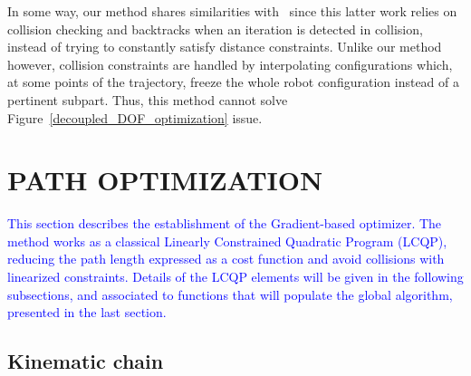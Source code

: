 \documentclass{tADR2e}
\begin{document}
In some way, our method shares similarities with~\cite{PanSmoothSplineShort} 
since this latter work relies on collision checking and backtracks when an 
iteration is detected in collision, instead of trying to constantly satisfy 
distance constraints. Unlike our method however, collision constraints are 
handled by interpolating configurations which, at some points of the trajectory, 
freeze the whole robot configuration instead of a pertinent subpart. Thus, this 
method cannot solve Figure~\ref{decoupled_DOF_optimization} issue.


\section{PATH OPTIMIZATION} \label{section:path_optim}

\textcolor{blue}{This section describes the establishment of the Gradient-based optimizer. The method works as a classical Linearly Constrained Quadratic Program (LCQP), reducing the path length expressed as a cost function and avoid collisions with linearized constraints. Details of the LCQP elements will be given in the following subsections, and associated to functions that will populate the global algorithm, presented in the last section.}

\subsection {Kinematic chain}
\end{document}
